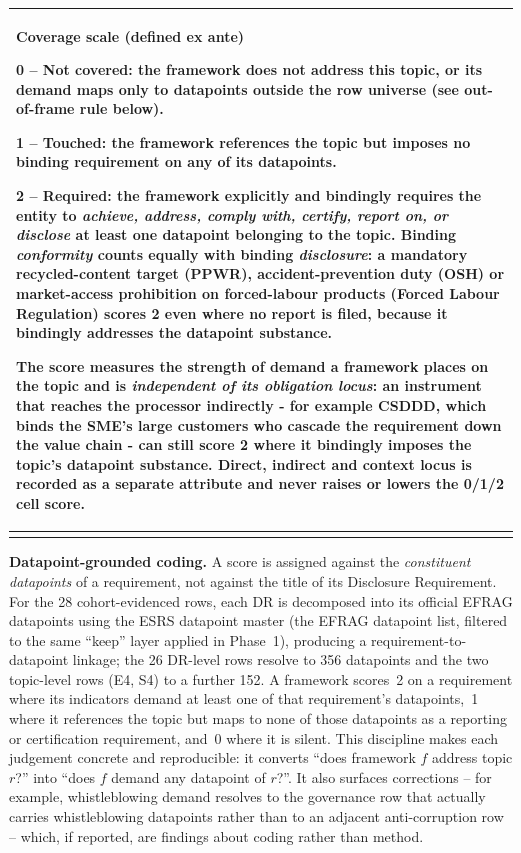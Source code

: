 \documentclass[
]{article}
\newcounter{none} %
\begin{document}
{\def\LTcaptype{none}
\begin{longtable}[]{@{}>{\raggedright\arraybackslash}p{\linewidth}@{}}
\toprule\noalign{}
\begin{minipage}[b]{\linewidth}\raggedright
\textbf{Coverage scale (defined ex ante)}

0 -- Not covered: the framework does not address this topic, or its
demand maps only to datapoints outside the row universe (see
out-of-frame rule below).

1 -- Touched: the framework references the topic but imposes no binding
requirement on any of its datapoints.

2 -- Required: the framework explicitly and bindingly requires the entity
to \emph{achieve, address, comply with, certify, report on, or disclose}
at least one datapoint belonging to the topic. Binding \emph{conformity}
counts equally with binding \emph{disclosure}: a mandatory
recycled-content target (PPWR), accident-prevention duty (OSH) or
market-access prohibition on forced-labour products (Forced Labour
Regulation) scores 2 even where no report is filed, because it bindingly
addresses the datapoint substance.

The score measures the strength of demand a framework places on the topic
and is \emph{independent of its obligation locus}: an instrument that
reaches the processor indirectly - for example CSDDD, which binds the
SME's large customers who cascade the requirement down the value chain - can still score 2 where it bindingly imposes the topic's datapoint
substance. Direct, indirect and context
locus is recorded as a separate attribute and never raises or lowers the
0/1/2 cell score.
\end{minipage} \\
\midrule\noalign{}
\endhead
\bottomrule\noalign{}
\endlastfoot
\end{longtable}}

\textbf{Datapoint-grounded coding.} A score is assigned against the
\emph{constituent datapoints} of a requirement, not against the title of
its Disclosure Requirement. For the 28 cohort-evidenced rows, each DR is
decomposed into its official EFRAG datapoints using the ESRS datapoint
master (the EFRAG datapoint list, filtered to the same ``keep'' layer
applied in Phase~1), producing a requirement-to-datapoint linkage; the 26
DR-level rows resolve to 356 datapoints and the two topic-level rows (E4,
S4) to a further 152. A framework scores~2 on a requirement where its
indicators demand at least one of that requirement's datapoints,~1 where
it references the topic but maps to none of those datapoints as a
reporting or certification requirement, and~0 where it is silent. This
discipline makes each judgement concrete and reproducible: it converts
``does framework $f$ address topic $r$?'' into ``does $f$ demand any
datapoint of $r$?''. It also surfaces corrections -- for
example, whistleblowing demand resolves to the governance row that
actually carries whistleblowing datapoints rather than to an adjacent
anti-corruption row -- which, if reported, are findings about coding
rather than method.
\end{document}

